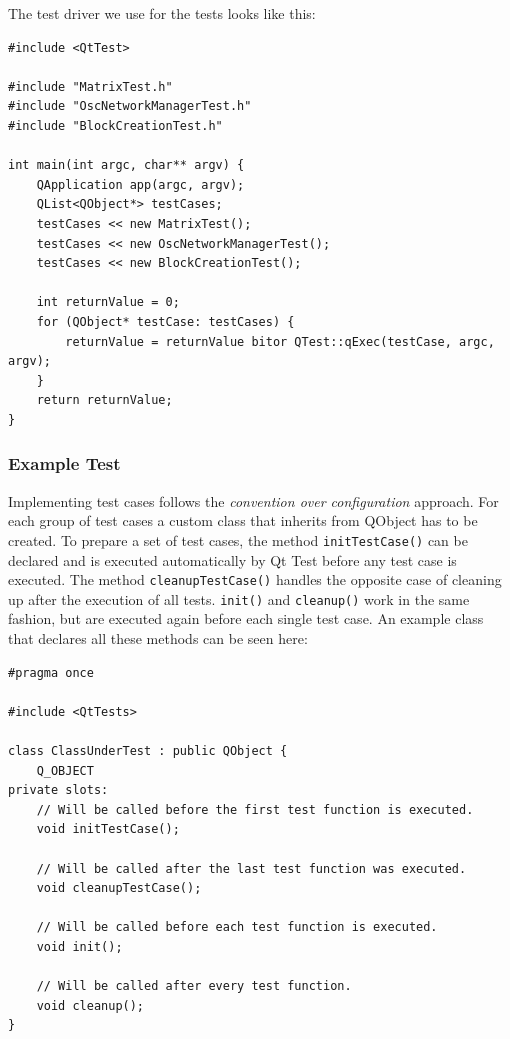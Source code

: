 \documentclass{scrreprt}
\begin{document}
The test driver we use for the tests looks like this:

\bigskip
\begin{lstlisting}[title=tests-qt/main.cpp]
#include <QtTest>

#include "MatrixTest.h"
#include "OscNetworkManagerTest.h"
#include "BlockCreationTest.h"

int main(int argc, char** argv) {
	QApplication app(argc, argv);	
	QList<QObject*> testCases;
	testCases << new MatrixTest();
	testCases << new OscNetworkManagerTest();
	testCases << new BlockCreationTest();
	
	int returnValue = 0;
	for (QObject* testCase: testCases) {
		returnValue = returnValue bitor QTest::qExec(testCase, argc, argv);
	}
	return returnValue;
}
\end{lstlisting}
\bigskip

\subsubsection{Example Test}

Implementing test cases follows the \textit{convention over configuration} approach. For each group of test cases a custom class that inherits from QObject has to be created. To prepare a set of test cases, the method \texttt{initTestCase()} can be declared and is executed automatically by Qt Test before any test case is executed. The method \texttt{cleanupTestCase()} handles the opposite case of cleaning up after the execution of all tests. \texttt{init()} and \texttt{cleanup()} work in the same fashion, but are executed again before each single test case. An example class that declares all these methods can be seen here:

\bigskip
\begin{lstlisting}[title=tests-qt/ClassUnderTest.h]
#pragma once

#include <QtTests>

class ClassUnderTest : public QObject {
	Q_OBJECT
private slots:
	// Will be called before the first test function is executed.
	void initTestCase();
	
	// Will be called after the last test function was executed.
	void cleanupTestCase();
	
	// Will be called before each test function is executed.
	void init();
	
	// Will be called after every test function.
	void cleanup();
}
\end{lstlisting}
\bigskip
\end{document}
